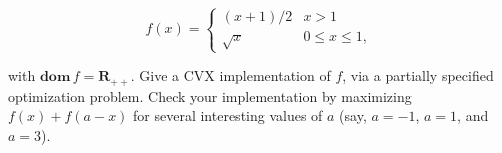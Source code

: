 \documentclass[11pt,a4paper]{article}
\begin{document}
\begin{itemize}
    \begin{equation*}
        f(x) = \begin{cases}
            (x+1)/2 & x>1\\
            \sqrt{x} & 0 \leq x \leq 1,
        \end{cases}
    \end{equation*}

    with $\textbf{dom} \, f = \mathbf{R}_{++}$. Give a CVX implementation of $f$, via a partially specified optimization problem. Check your implementation by maximizing $f(x) + f(a - x)$ for several interesting values of $a$ (say, $a = -1$, $a = 1$, and $a = 3$).
\end{itemize}
\end{document}
